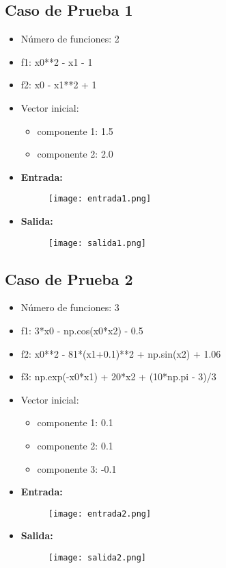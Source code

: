 \documentclass[12pt]{article}
\begin{document}
\subsection{Caso de Prueba 1}
\begin{itemize}
    \item Número de funciones: 2
    \item f1: x0**2 - x1 - 1
    \item f2: x0 - x1**2 + 1
    \item Vector inicial:
        \begin{itemize}
            \item componente 1: 1.5
            \item componente 2: 2.0
        \end{itemize}
    \item \textbf{Entrada:}
        \begin{figure}[H]
            \centering
            \texttt{[image: entrada1.png]}
            \label{fig:enter-label}
        \end{figure}
    \item \textbf{Salida:}
        \begin{figure}[H]
            \centering
            \texttt{[image: salida1.png]}
            \label{fig:enter-label}
        \end{figure}
\end{itemize}

\subsection{Caso de Prueba 2}
\begin{itemize}
    \item Número de funciones: 3
    \item f1: 3*x0 - np.cos(x0*x2) - 0.5
    \item f2: x0**2 - 81*(x1+0.1)**2 + np.sin(x2) + 1.06
    \item f3: np.exp(-x0*x1) + 20*x2 + (10*np.pi - 3)/3
    \item Vector inicial:
        \begin{itemize}
            \item componente 1: 0.1
            \item componente 2: 0.1
            \item componente 3: -0.1
        \end{itemize}
    \item \textbf{Entrada:}
        \begin{figure}[H]
            \centering
            \texttt{[image: entrada2.png]}
            \label{fig:enter-label}
        \end{figure}
    \item \textbf{Salida:}
        \begin{figure}[H]
            \centering
            \texttt{[image: salida2.png]}
            \label{fig:enter-label}
        \end{figure}
\end{itemize}
\end{document}
